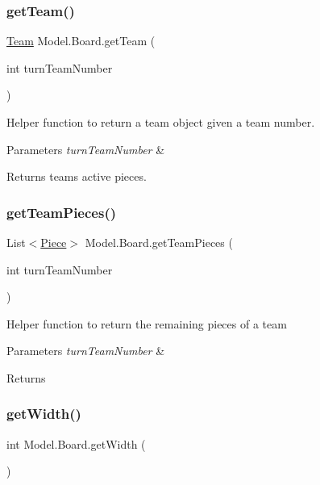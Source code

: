 \subsubsection{\texorpdfstring{get\+Team()}{getTeam()}}
{\footnotesize\ttfamily \hyperlink{class_model_1_1_team}{Team} Model.\+Board.\+get\+Team (\begin{DoxyParamCaption}\item[{int}]{turn\+Team\+Number }\end{DoxyParamCaption})}

Helper function to return a team object given a team number. 
\begin{DoxyParams}{Parameters}
{\em turn\+Team\+Number} & \\
\hline
\end{DoxyParams}
\begin{DoxyReturn}{Returns}
team\textquotesingle{}s active pieces. 
\end{DoxyReturn}
\hypertarget{class_model_1_1_board_abce1029b057dce2939f5dd78abad3cec}{}\label{class_model_1_1_board_abce1029b057dce2939f5dd78abad3cec} 
\subsubsection{\texorpdfstring{get\+Team\+Pieces()}{getTeamPieces()}}
{\footnotesize\ttfamily List$<$\hyperlink{class_model_1_1_pieces_1_1_piece}{Piece}$>$ Model.\+Board.\+get\+Team\+Pieces (\begin{DoxyParamCaption}\item[{int}]{turn\+Team\+Number }\end{DoxyParamCaption})}

Helper function to return the remaining pieces of a team 
\begin{DoxyParams}{Parameters}
{\em turn\+Team\+Number} & \\
\hline
\end{DoxyParams}
\begin{DoxyReturn}{Returns}

\end{DoxyReturn}
\hypertarget{class_model_1_1_board_ab6dc3bc9760045e82fa57053f816649f}{}\label{class_model_1_1_board_ab6dc3bc9760045e82fa57053f816649f} 
\subsubsection{\texorpdfstring{get\+Width()}{getWidth()}}
{\footnotesize\ttfamily int Model.\+Board.\+get\+Width (\begin{DoxyParamCaption}{ }\end{DoxyParamCaption})}

